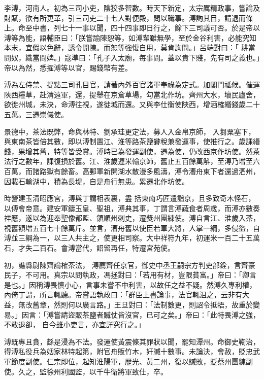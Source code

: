 \begin{pinyinscope}
 李溥，河南人。初為三司小吏，陰狡多智數。時天下新定，太宗厲精政事，嘗論及財賦，欲有所更革，引三司吏二十七人對便殿，問以職事。溥詢其目，請退而條上。命至中書，列七十一事以聞，四十四事即日行之，餘下三司議可否。於是帝以溥等為能，語輔臣曰：「朕嘗諭陳恕等，如溥輩雖無學，至於金谷利害，必能究知本末，宜假以色辭，誘令開陳。而恕等強愎自用，莫肯詢問。」呂端對曰：「
 耕當問奴，織當問婢。」寇準曰：「孔子入太廟，每事問。蓋以貴下賤，先有司之義也。」帝以為然，悉擢溥等以官，賜錢幣有差。



 溥為左侍禁、提點三司孔目官，請著內外百官諸軍奉祿為定式。加閣門祗候。催運陜西糧草，赴清遠軍，還，提舉在京倉草場，勾當北作坊。齊州大水，壞民廬舍，欲徙州城，未決，命溥往視，遂徙城而還。又與李仕衡使陜西，增酒榷緡錢歲二十五萬。三遷崇儀使。



 景德中，茶法既弊，命與林特、劉承珪更定法，募人入金帛京師，
 入芻粟塞下，與東南茶皆倍其數，即以溥制置江、淮等路茶鹽礬稅兼發運事，使推行之。歲課緡錢，果增其舊，特等皆受賞。溥時已為發運副使，遷為使，仍改西京作坊使。然茶法行之數年，課復損於舊。江、淮歲運米輸京師，舊止五百餘萬斛，至溥乃增至六百萬，而諸路獄有餘畜。高郵軍新開湖水散漫多風濤，溥令漕舟東下者還過泗州，因載石輸湖中，積為長堤，自是舟行無患。累遷北作坊使。



 時營建玉清昭應宮，溥與丁謂相表裏，盡
 括東南巧匠遣詣京，且多致奇木怪石，以傅會帝意。建安軍鑄玉皇、聖祖，溥典其事，丁謂言溥蔬食者周歲，而溥亦數奏祥應，遂以為迎奉聖像都監、領順州刺史，遷獎州團練使。溥自言江、淮歲入茶，視舊額增五百七十餘萬斤。並言，漕舟舊以使臣若軍大將，人掌一綱，多侵盜，自溥並三綱為一，以三人共主之，使更相司察。大中祥符九年，初運米一百二十五萬石，才失二百石。會溥當代，詔留再任，特遷宮苑使。



 初，譙縣尉陳齊論榷茶法，
 溥薦齊任京官，御史中丞王嗣宗方判吏部銓，言齊豪民子，不可用。真宗以問執政，馮拯對曰：「若用有材，豈限貧富。」帝曰：「卿言是也。」因稱溥畏慎小心，言事未嘗不中利害，以故任之益不疑。然溥久專利權，內倚丁謂，所言輒聽。帝嘗語執政曰：「群臣上書論事，法官輒沮之，云非有大益，無改舊章，然則何以廣言路。」王旦對曰：「法制數更，則詔令抵牾，故重於變易。」因言：「溥嘗請盜販茶鹽者贓仗皆沒官，已可之矣。」帝曰：「此特畏溥之強，不敢退卻，
 自今雖小吏言，亦宜詳究行之。」



 溥既專且貪，繇是浸為不法。發運使黃震條其罪狀以聞，罷知潭州。命御史鞫治，得溥私役兵為姻家林特起第，附官舟販竹木，奸贓十數事。未論決，會赦，貶忠武軍節度副使。仁宗即位，起知淮陽軍，歷光、黃二州，復以贓敗，貶蔡州團練副使。久之，監徐州利國監，以千牛衛將軍致仕，卒。




\end{pinyinscope}
